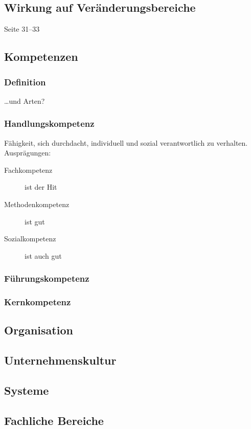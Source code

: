 \documentclass[a4paper, 12pt]{article}
\begin{document}
\subsection{Wirkung auf Veränderungsbereiche}
Seite 31--33


\subsection{Kompetenzen}

\subsubsection*{Definition}
\ldots und Arten?

\subsubsection*{Handlungskompetenz}
Fähigkeit, sich durchdacht, individuell und sozial verantwortlich zu verhalten. Ausprägungen:
\begin{description}
  \item[Fachkompetenz] ist der Hit
  \item[Methodenkompetenz] ist gut
  \item[Sozialkompetenz] ist auch gut
\end{description}

\subsubsection*{Führungskompetenz}

\subsubsection*{Kernkompetenz}


\subsection{Organisation}


\subsection{Unternehmenskultur}


\subsection{Systeme}


\subsection{Fachliche Bereiche}
\end{document}
